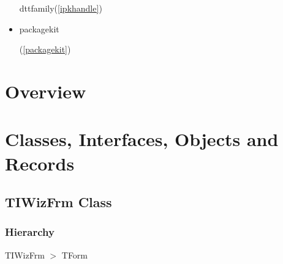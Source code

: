 \documentclass{report}
\newif\ifpdf
\begin{document}
\begin{itemize}
d{ttfamily}(\ref{ipkhandle})\item \begin{ttfamily}packagekit\end{ttfamily}(\ref{packagekit})\end{itemize}
\section{Overview}
\begin{description}
\item[\texttt{\begin{ttfamily}TIWizFrm\end{ttfamily} Class}]
\end{description}
\section{Classes, Interfaces, Objects and Records}
\ifpdf
\subsection*{\large{\textbf{TIWizFrm Class}}\normalsize\hspace{1ex}\hrulefill}
\else
\subsection*{TIWizFrm Class}
\fi
\label{imainunit.TIWizFrm}
\subsubsection*{\large{\textbf{Hierarchy}}\normalsize\hspace{1ex}\hfill}
TIWizFrm {$>$} TForm
\end{document}
